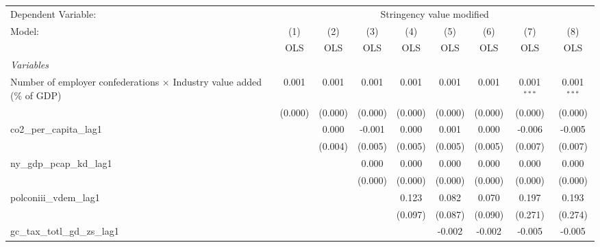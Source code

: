 
\begingroup
\centering
\begin{tabular}{lcccccccc}
   \toprule
   Dependent Variable: & \multicolumn{8}{c}{Stringency value modified}\\
   Model:                                                                        & (1)     & (2)     & (3)     & (4)     & (5)     & (6)     & (7)           & (8)\\  
                                                                                 &  OLS    & OLS     & OLS     & OLS     & OLS     & OLS     & OLS           & OLS\\  
   \midrule
   \emph{Variables}\\
   Number of employer confederations $\times$ Industry value added (\% of GDP)   & 0.001   & 0.001   & 0.001   & 0.001   & 0.001   & 0.001   & 0.001$^{***}$ & 0.001$^{***}$\\   
                                                                                 & (0.000) & (0.000) & (0.000) & (0.000) & (0.000) & (0.000) & (0.000)       & (0.000)\\   
   co2\_per\_capita\_lag1                                                        &         & 0.000   & -0.001  & 0.000   & 0.001   & 0.000   & -0.006        & -0.005\\   
                                                                                 &         & (0.004) & (0.005) & (0.005) & (0.005) & (0.005) & (0.007)       & (0.007)\\   
   ny\_gdp\_pcap\_kd\_lag1                                                       &         &         & 0.000   & 0.000   & 0.000   & 0.000   & 0.000         & 0.000\\   
                                                                                 &         &         & (0.000) & (0.000) & (0.000) & (0.000) & (0.000)       & (0.000)\\   
   polconiii\_vdem\_lag1                                                         &         &         &         & 0.123   & 0.082   & 0.070   & 0.197         & 0.193\\   
                                                                                 &         &         &         & (0.097) & (0.087) & (0.090) & (0.271)       & (0.274)\\   
   gc\_tax\_totl\_gd\_zs\_lag1                                                   &         &         &         &         & -0.002  & -0.002  & -0.005        & -0.005\\   

\end{tabular}
